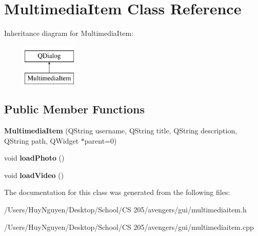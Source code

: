 \hypertarget{classMultimediaItem}{}\section{Multimedia\+Item Class Reference}
\label{classMultimediaItem}
Inheritance diagram for Multimedia\+Item\+:\begin{figure}[H]
\begin{center}
\leavevmode
\includegraphics[height=2.000000cm]{classMultimediaItem}
\end{center}
\end{figure}
\subsection*{Public Member Functions}
\begin{DoxyCompactItemize}
\item 
{\bfseries Multimedia\+Item} (Q\+String username, Q\+String title, Q\+String description, Q\+String path, Q\+Widget $\ast$parent=0)\hypertarget{classMultimediaItem_aa99ab7cf2a4684b4c396003258f2ed98}{}\label{classMultimediaItem_aa99ab7cf2a4684b4c396003258f2ed98}

\item 
void {\bfseries load\+Photo} ()\hypertarget{classMultimediaItem_a85cec06f60c3a2d55062b4dab854d12e}{}\label{classMultimediaItem_a85cec06f60c3a2d55062b4dab854d12e}

\item 
void {\bfseries load\+Video} ()\hypertarget{classMultimediaItem_a65e1f3b5dad127b2f887a9c30e0f881a}{}\label{classMultimediaItem_a65e1f3b5dad127b2f887a9c30e0f881a}

\end{DoxyCompactItemize}


The documentation for this class was generated from the following files\+:\begin{DoxyCompactItemize}
\item 
/\+Users/\+Huy\+Nguyen/\+Desktop/\+School/\+C\+S 205/avengers/gui/multimediaitem.\+h\item 
/\+Users/\+Huy\+Nguyen/\+Desktop/\+School/\+C\+S 205/avengers/gui/multimediaitem.\+cpp\end{DoxyCompactItemize}
